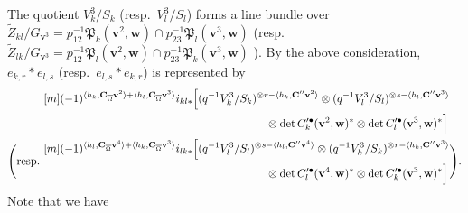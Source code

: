 \documentclass[12pt]{amsart}
\def\frak{\mathfrak}
\renewcommand{\labelenumi}{(\theenumi)}%
\newenvironment{aenume}{%
  \begin{enumerate}%
  \renewcommand{\theenumi}{\alph{enumi}}%
  \renewcommand{\labelenumi}{(\theenumi)}%
  }{\end{enumerate}}
\theoremstyle{definition}
\theoremstyle{remark}
\numberwithin{equation}{subsection}
\newcommand{\Ima}{\operatorname{Im}}
\newcommand{\bv}{{\mathbf v}} %
\newcommand{\bw}{{\mathbf w}} %
\newcommand{\bC}{{\mathbf C}} %
\newcommand{\Pa}{{\frak P}} %
\begin{document}

The quotient $V_k^3/S_k$ (resp.\ $V_l^3/S_l$) forms a line bundle
over
\(
  \widetilde Z_{kl}/G_{\bv^3} 
  =  p_{12}^{-1}\Pa_k(\bv^2,\bw) \cap p_{23}^{-1}\Pa_{l}(\bv^3,\bw)
\)
(resp.\ 
\(
  \widetilde Z_{lk}/G_{\bv^3}
   = p_{12}^{-1}\Pa_{l}(\bv^2,\bw) \cap p_{23}^{-1}\Pa_{k}(\bv^3,\bw)
\)
).
By the above consideration, $e_{k,r}\ast e_{l,s}$
(resp.\ $e_{l,s}\ast e_{k,r}$) is represented by
{\allowdisplaybreaks[4]
\begin{equation}\label{eq:E_krE_ls}
\begin{split}
   & 
  \begin{aligned}[m]
   (-1)^{\langle h_k, \bC_{\overline{\Omega}}\bv^2\rangle
        +\langle h_l, \bC_{\overline{\Omega}}\bv^3\rangle}
   i_{kl*}\Bigl[
   & (q^{-1}V^3_k/S_k)^{\otimes r-\langle h_k, \bC''\bv^2\rangle}
     \otimes (q^{-1}V^3_l/S_l)^{\otimes s-\langle h_l, \bC''\bv^3\rangle}\\
   &\qquad\qquad\qquad
   \otimes \det C_k^{\prime\bullet}(\bv^2,\bw)^*
   \otimes \det C_l^{\prime\bullet}(\bv^3,\bw)^*\Bigr]
  \end{aligned}
 \\
   \Biggl(
   \text{resp.\ }&
   \begin{aligned}[m]
    (-1)^{\langle h_l, \bC_{\overline{\Omega}}\bv^4\rangle
         +\langle h_k, \bC_{\overline{\Omega}}\bv^3\rangle}
    i_{lk*}\Bigl[
    & (q^{-1}V^3_l/S_l)^{\otimes s-\langle h_l, \bC''\bv^4\rangle}
     \otimes (q^{-1}V^3_k/S_k)^{\otimes r-\langle h_k, \bC''\bv^3\rangle}\\
   &\qquad\qquad\qquad
   \otimes \det C_l^{\prime\bullet}(\bv^4,\bw)^*
   \otimes \det C_k^{\prime\bullet}(\bv^3,\bw)^*\Bigr]
   \end{aligned}
\Biggr).
\end{split}
\end{equation}
Note} that we have
\end{document}
